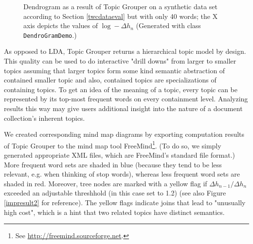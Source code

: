 \documentclass[10pt, a4paper, oneside]{article}
\begin{document}
\begin{figure}
\caption{Dendrogram as a result of Topic Grouper on a synthetic data set according to Section \ref{twcdataeval} but with only 40 words; the X axis  depicts the values of $\log - \Delta h_{n}$ (Generated with class \texttt{DendroGramDemo}.)}
\label{dendrogram}
\end{figure}

As opposed to LDA, Topic Grouper returns a hierarchical topic model by design.
This quality can be used to do interactive "drill downs" from larger to smaller topics assuming that larger topics form some kind semantic abstraction of contained smaller topic and also, contained topics are specializations of containing topics. To get an idea of the meaning of a topic, every topic can be represented by its top-most frequent words on every containment level.
Analyzing results this way may give users additional insight into the nature of a document collection's inherent topics.

We created corresponding mind map diagrams by exporting computation results of Topic Grouper to the mind map tool FreeMind\footnote{See
\href{http://freemind.sourceforge.net}{http://freemind.sourceforge.net}.}. (To do so, we simply generated appropriate XML files, which are FreeMind's standard file format.) More frequent word sets are shaded in blue (because they tend to be less relevant, e.g. when thinking of stop words), whereas less frequent word sets are shaded in red. Moreover, tree nodes are marked with a yellow flag if 
$\Delta h_{n-1} / \Delta h_{n}$ exceeded an adjustable threshhold (in this case set to 1.2) (see also Figure \ref{impresult2} for reference).
The yellow flags indicate joins that lead to "unusually high cost", which is a hint that two related topics have distinct semantics.
\end{document}
